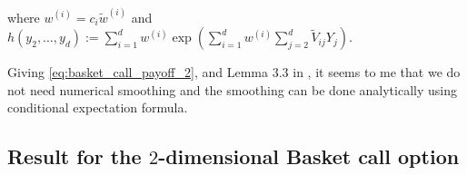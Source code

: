 where $w^{(i)}=c_i \tilde{w}^{(i)}$ and $h(y_2,\dots,y_d):= \sum_{i=1}^{d} w^{(i)} \exp\left(\sum_{i=1}^{d} w^{(i)}  \sum_{j=2}^{d}\widetilde{V}_{ij} Y_j \right)$. 


Giving  \eqref{eq:basket_call_payoff_2}, and Lemma $3.3$ in \cite{bayersmoothing}, it seems to me that we do not  need numerical smoothing and the smoothing can be done analytically using conditional expectation formula. 









%




\subsection{Result for the  $2$-dimensional Basket call option}\label{sec:Result for the  $2$-dimensional Basket call option}
